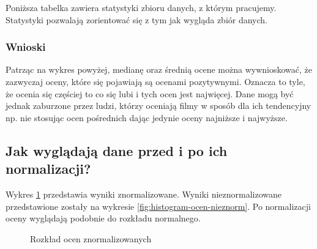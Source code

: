 \documentclass[12pt, a4paper]{article}
\begin{document}
Poniższa tabelka zawiera statystyki zbioru danych, z którym pracujemy. Statystyki pozwalają zorientować się z tym jak wygląda zbiór danych.


\subsubsection{Wnioski}
Patrząc na wykres powyżej, medianę oraz średnią ocene można wywnioskować, że zazwyczaj oceny, które się pojawiają są ocenami pozytywnymi. Oznacza to tyle, że ocenia się częściej to co się lubi i tych ocen jest najwięcej. Dane mogą być jednak zaburzone przez ludzi, którzy oceniają filmy w sposób dla ich tendencyjny np. nie stosując ocen pośrednich dając jedynie oceny najniższe i najwyższe.

\subsection{Jak wyglądają dane przed i po ich normalizacji?}
Wykres \ref{fig:histogram-ocen-norm} przedstawia wyniki znormalizowane. Wyniki nieznormalizowane przedstawione zostały na wykresie \ref{fig:histogram-ocen-nieznorm}. Po normalizacji oceny wyglądają podobnie do rozkładu normalnego.
\begin{figure}[H]
  \begin{center}
  \end{center}
  \caption{Rozkład ocen znormalizowanych}
  \label{fig:histogram-ocen-norm}
\end{figure}
\end{document}
